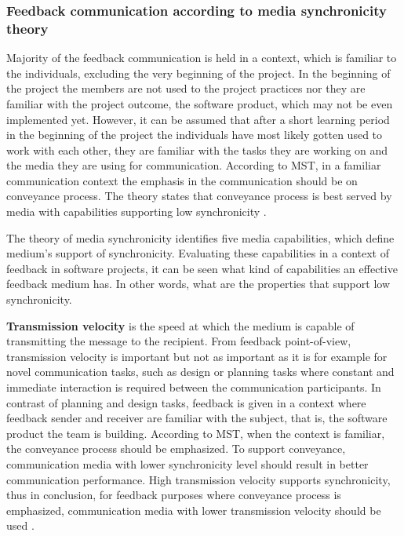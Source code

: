 \documentclass[english,12pt,a4paper,pdftex]{article}
\begin{document}

\subsubsection{Feedback communication according to media synchronicity theory}

Majority of the feedback communication is held in a context, which is familiar to the individuals, excluding the very beginning of the project. In the beginning of the project the members are not used to the project practices nor they are familiar with the project outcome, the software product, which may not be even implemented yet. However, it can be assumed that after a short learning period in the beginning of the project the individuals have most likely gotten used to work with each other, they are familiar with the tasks they are working on and the media they are using for communication. According to \ac{MST}, in a familiar communication context the emphasis in the communication should be on conveyance process. The theory states that conveyance process is best served by media with capabilities supporting low synchronicity \citep{dennis1999} \citep{dennis2008}.

The theory of media synchronicity identifies five media capabilities, which define medium's support of synchronicity. Evaluating these capabilities in a context of feedback in software projects, it can be seen what kind of capabilities an effective feedback medium has. In other words, what are the properties that support low synchronicity.

\textbf{Transmission velocity} is the speed at which the medium is capable of transmitting the message to the recipient. From feedback point-of-view, transmission velocity is important but not as important as it is for example for novel communication tasks, such as design or planning tasks where constant and immediate interaction is required between the communication participants. In contrast of planning and design tasks, feedback is given in a context where feedback sender and receiver are familiar with the subject, that is, the software product the team is building. According to \ac{MST}, when the context is familiar, the conveyance process should be emphasized. To support conveyance, communication media with lower synchronicity level should result in better communication performance. High transmission velocity supports synchronicity, thus in conclusion, for feedback purposes where conveyance process is emphasized, communication media with lower transmission velocity should be used \citep{dennis1999}.
\end{document}
